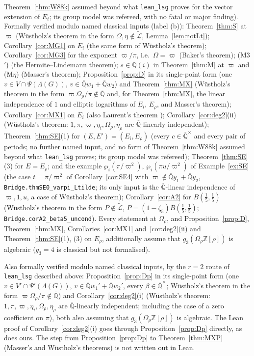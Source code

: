 \documentclass[11pt]{amsart}
\theoremstyle{definition}
\newcommand{\Qb}{\overline{\mathbb{Q}}}
\newcommand{\Q}{\mathbb{Q}}
\newcommand{\Z}{\mathbb{Z}}
\newcommand{\Lt}{\widetilde{\mathcal{L}}}
\newcommand{\vp}{\varpi}
\begin{document}
Theorem~\ref{thm:W88k} assumed beyond what \texttt{lean\_lsg} proves for the vector extension of $E_i$; its group model was
refereed, with no fatal or major finding). Formally verified modulo named classical inputs
(label (b)): Theorem~\ref{thm:S} at $\vp$ (W\"ustholz's theorem in the form $\Omega,\eta\notin\Lt$, Lemma~\ref{lem:notLt});
Corollary~\ref{cor:MG1} on $E_i$ (the same form of W\"ustholz's theorem); Corollary~\ref{cor:MG3} for the exponent $\vp/\pi$,
i.e.\ $\Omega=\vp$ (Baker's theorem); (M3$'$) (the Hermite--Lindemann theorem); $s\in\Q(i)$ in Theorem~\ref{thm:M} at $\vp$
and (M$\eta$) (Masser's theorem); Proposition~\ref{prop:D} in its single-point form (one $v\in V\cap\Psi(\Lambda(G))$,
$v\in\Qb w_1+\Qb w_2$) and Theorem~\ref{thm:MX} (W\"ustholz's theorem in the form $\vp\Omega_\rho/\pi\notin\Qb$
and, for Theorem~\ref{thm:MX}, the linear independence of $1$ and elliptic logarithms of $E_i$,
$E_\rho$, and Masser's theorem); Corollary~\ref{cor:MX1} on $E_i$ (also Laurent's theorem \cite{La80});
Corollary~\ref{cor:deg2}(ii) (W\"ustholz's theorem: $1,\pi,\vp,\eta_i,\Omega_\rho,\eta_\rho$ are $\Qb$-linearly
independent); Theorem~\ref{thm:SE}(1) for $(E,E')=(E_i,E_\rho)$ (every $c\in\Qb^\times$ and every pair of periods; no
further named input, and no form of Theorem~\ref{thm:W88k} assumed beyond what \texttt{lean\_lsg} proves; its group model
was refereed); Theorem~\ref{thm:SE}(3) for $E=E_\rho$; and the example $\wp_i(\pi/\vp^2)$, $\wp_i(\pi u/\vp^2)$ of
Example~\ref{ex:SE} (the case $t=\pi/\vp^2$ of Corollary~\ref{cor:SE4} with $\vp\notin\Qb y_1+\Qb y_2$,
\texttt{Bridge.thmSE0\_varpi\_Ltilde}; its only input is the $\Qb$-linear independence of $\vp,1,u$, a case of W\"ustholz's
theorem); Corollary~\ref{cor:A2} for $B(\frac15,\frac15)$ (W\"ustholz's theorem in the form $P\notin\Lt$,
$P=(1-\zeta_5)B(\frac15,\frac15)$; \texttt{Bridge.corA2\_beta5\_uncond}). Every statement at
$\Omega_\rho$, and Proposition~\ref{prop:D}, Theorem~\ref{thm:MX}, Corollaries~\ref{cor:MX1} and~\ref{cor:deg2}(ii) and
Theorem~\ref{thm:SE}(1), (3) on $E_\rho$, additionally assume that $g_3(\Omega_\rho\Z[\rho])$ is algebraic ($g_3=4$ is classical but not
formalised).

Also formally verified modulo named classical inputs, by the $r=2$ route of \texttt{lean\_lsg} described above:
Proposition~\ref{prop:Dp} in its single-point form (one $v\in V'\cap\Psi'(\Lambda(G))$, $v\in\Qb w_1'+\Qb w_2'$, every
$\beta\in\Qb^\times$; W\"ustholz's theorem in the form $\vp\Omega_\rho/\pi\notin\Qb$) and
Corollary~\ref{cor:deg2}(i) (W\"ustholz's theorem: $1,\pi,\vp,\eta_i,\Omega_\rho,\eta_\rho$ are $\Qb$-linearly independent;
including the case of a zero coefficient on $\pi$), both also assuming that $g_3(\Omega_\rho\Z[\rho])$ is algebraic. The
Lean proof of Corollary~\ref{cor:deg2}(i) goes through Proposition~\ref{prop:Dp} directly, as does ours. The step from
Proposition~\ref{prop:Dp} to Theorem~\ref{thm:MXP} (Masser's and W\"ustholz's theorems) is not written out in Lean.
\end{document}

